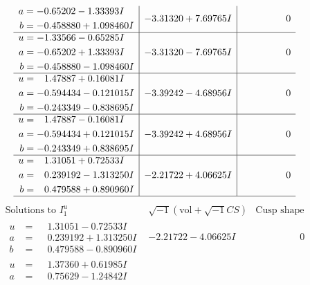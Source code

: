 \documentclass[1p]{elsarticle_modified}
\theoremstyle{definition}
\newcommand{\I}{\sqrt{-1}}
\begin{document}
$$\begin{array}{c|c|c}
\begin{aligned}
a &= -0.65202 - 1.33393 I \\
b &= -0.458880 + 1.098460 I\end{aligned}
 & -3.31320 + 7.69765 I & \phantom{-0.000000 } 0 \\ \hline\begin{aligned}
u &= -1.33566 - 0.65285 I \\
a &= -0.65202 + 1.33393 I \\
b &= -0.458880 - 1.098460 I\end{aligned}
 & -3.31320 - 7.69765 I & \phantom{-0.000000 } 0 \\ \hline\begin{aligned}
u &= \phantom{-}1.47887 + 0.16081 I \\
a &= -0.594434 - 0.121015 I \\
b &= -0.243349 - 0.838695 I\end{aligned}
 & -3.39242 - 4.68956 I & \phantom{-0.000000 } 0 \\ \hline\begin{aligned}
u &= \phantom{-}1.47887 - 0.16081 I \\
a &= -0.594434 + 0.121015 I \\
b &= -0.243349 + 0.838695 I\end{aligned}
 & -3.39242 + 4.68956 I & \phantom{-0.000000 } 0 \\ \hline\begin{aligned}
u &= \phantom{-}1.31051 + 0.72533 I \\
a &= \phantom{-}0.239192 - 1.313250 I \\
b &= \phantom{-}0.479588 + 0.890960 I\end{aligned}
 & -2.21722 + 4.06625 I & \phantom{-0.000000 } 0\\
 \hline 
 \end{array}$$\newpage$$\begin{array}{c|c|c}  
\text{Solutions to }I^u_{1}& \I (\text{vol} + \sqrt{-1}CS) & \text{Cusp shape}\\
 \hline 
\begin{aligned}
u &= \phantom{-}1.31051 - 0.72533 I \\
a &= \phantom{-}0.239192 + 1.313250 I \\
b &= \phantom{-}0.479588 - 0.890960 I\end{aligned}
 & -2.21722 - 4.06625 I & \phantom{-0.000000 } 0 \\ \hline\begin{aligned}
u &= \phantom{-}1.37360 + 0.61985 I \\
a &= \phantom{-}0.75629 - 1.24842 I \\

\end{aligned}
\end{array}$$
\end{document}
